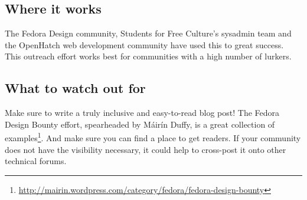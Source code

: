 \subsection{Where it works}
The Fedora Design community, Students for Free Culture’s sysadmin team and the OpenHatch web development community have used this to great success. This outreach effort works best for communities with a high number of lurkers.

\subsection{What to watch out for}
Make sure to write a truly inclusive and easy-to-read blog post! The Fedora Design Bounty effort, spearheaded by Máirín Duffy, is a great collection of examples\footnote{\url{http://mairin.wordpress.com/category/fedora/fedora-design-bounty}}. And make sure you can find a place to get readers. If your community does not have the visibility necessary, it could help to cross-post it onto other technical forums.